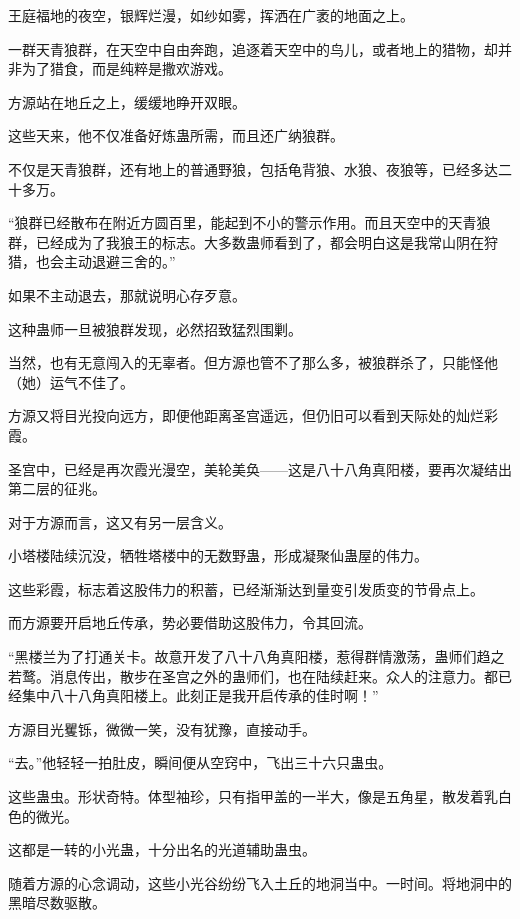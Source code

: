 
\begin{this_body}

王庭福地的夜空，银辉烂漫，如纱如雾，挥洒在广袤的地面之上。

一群天青狼群，在天空中自由奔跑，追逐着天空中的鸟儿，或者地上的猎物，却并非为了猎食，而是纯粹是撒欢游戏。

方源站在地丘之上，缓缓地睁开双眼。

这些天来，他不仅准备好炼蛊所需，而且还广纳狼群。

不仅是天青狼群，还有地上的普通野狼，包括龟背狼、水狼、夜狼等，已经多达二十多万。

“狼群已经散布在附近方圆百里，能起到不小的警示作用。而且天空中的天青狼群，已经成为了我狼王的标志。大多数蛊师看到了，都会明白这是我常山阴在狩猎，也会主动退避三舍的。”

如果不主动退去，那就说明心存歹意。

这种蛊师一旦被狼群发现，必然招致猛烈围剿。

当然，也有无意闯入的无辜者。但方源也管不了那么多，被狼群杀了，只能怪他（她）运气不佳了。

方源又将目光投向远方，即便他距离圣宫遥远，但仍旧可以看到天际处的灿烂彩霞。

圣宫中，已经是再次霞光漫空，美轮美奂——这是八十八角真阳楼，要再次凝结出第二层的征兆。

对于方源而言，这又有另一层含义。

小塔楼陆续沉没，牺牲塔楼中的无数野蛊，形成凝聚仙蛊屋的伟力。

这些彩霞，标志着这股伟力的积蓄，已经渐渐达到量变引发质变的节骨点上。

而方源要开启地丘传承，势必要借助这股伟力，令其回流。

“黑楼兰为了打通关卡。故意开发了八十八角真阳楼，惹得群情激荡，蛊师们趋之若鹜。消息传出，散步在圣宫之外的蛊师们，也在陆续赶来。众人的注意力。都已经集中八十八角真阳楼上。此刻正是我开启传承的佳时啊！”

方源目光矍铄，微微一笑，没有犹豫，直接动手。

“去。”他轻轻一拍肚皮，瞬间便从空窍中，飞出三十六只蛊虫。

这些蛊虫。形状奇特。体型袖珍，只有指甲盖的一半大，像是五角星，散发着乳白色的微光。

这都是一转的小光蛊，十分出名的光道辅助蛊虫。

随着方源的心念调动，这些小光谷纷纷飞入土丘的地洞当中。一时间。将地洞中的黑暗尽数驱散。


\end{this_body}
